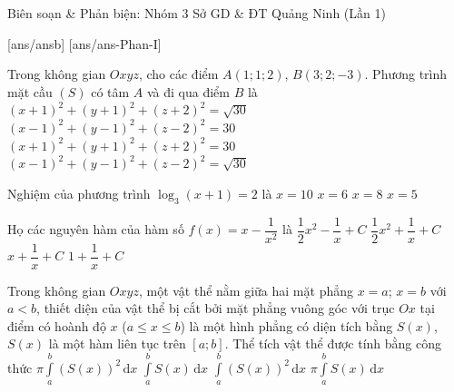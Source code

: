 \begin{name}
	{Biên soạn \& Phản biện: Nhóm 3}
	{Sở GD \& ĐT Quảng Ninh (Lần 1)}
\end{name}
[ans/ansb\currfilebase]
\caulc
{}[ans/ans\currfilebase-Phan-I]
\begin{ex}%
	Trong không gian $Oxyz$, cho các điểm $A(1;1;2)$, $B(3;2;-3)$. Phương trình mặt cầu $(S)$ có tâm $A$ và đi qua điểm $B$ là
	\choice
		{$(x+1)^2+(y+1)^2+(z+2)^2 = \sqrt{30}$}
		{\True $(x-1)^2+(y-1)^2+(z-2)^2 = 30$}
		{$(x+1)^2+(y+1)^2+(z+2)^2 = 30$}
		{$(x-1)^2+(y-1)^2+(z-2)^2 = \sqrt{30}$}
\end{ex}

\begin{ex}%
	Nghiệm của phương trình $\log_3(x+1)=2$ là
	\choice
		{$x=10$}
		{$x=6$}
		{\True $x=8$}
		{$x=5$}
\end{ex}

\begin{ex}%
	Họ các nguyên hàm của hàm số $f(x) = x - \dfrac{1}{x^2}$ là
	\choice
		{$\dfrac{1}{2}x^2 - \dfrac{1}{x} + C$}
		{\True $\dfrac{1}{2}x^2 + \dfrac{1}{x} + C$}
		{$x + \dfrac{1}{x} + C$}
		{$1 + \dfrac{1}{x} + C$}
\end{ex}

\begin{ex}%
	Trong không gian $Oxyz$, một vật thể nằm giữa hai mặt phẳng $x=a$; $x=b$ với $a < b$, thiết diện của vật thể bị cắt bởi mặt phẳng vuông góc với trục $Ox$ tại điểm có hoành độ $x$ ($a \leq x \leq b$) là một hình phẳng có diện tích bằng $S(x)$, $S(x)$ là một hàm liên tục trên $[a;b]$. Thể tích vật thể được tính bằng công thức
	\choice
		{$\pi \displaystyle\int\limits_a^b \left(S(x)\right)^2 \mathrm{\,d}x$}
		{\True $\displaystyle\int\limits_a^b S(x) \mathrm{\,d}x$}
		{$\displaystyle\int\limits_a^b \left(S(x)\right)^2 \mathrm{\,d}x$}
		{$\pi \displaystyle\int\limits_a^b S(x) \mathrm{\,d}x$}
\end{ex}


